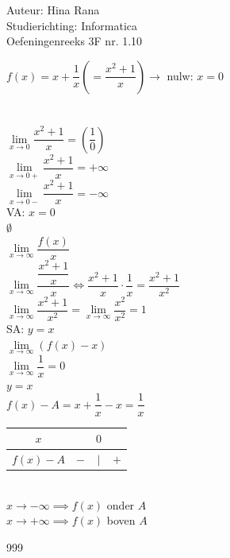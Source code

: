 \documentclass[a4paper]{article}
\begin{document}
\noindent \large Auteur: Hina Rana \\
\noindent \large Studierichting: Informatica\\
\noindent \large Oefeningenreeks 3F nr. 1.10\\

\medskip

\normalsize

$f(x) = x + \dfrac{1}{x} \left(= \dfrac{x^2+1}{x}\right) \to$ nulw: $x = 0$ \\
\\

 \\

$\lim\limits_{x \to 0} \dfrac{x^2+1}{x} = \left(\dfrac{1}{0}\right)$ \\

$\lim\limits_{x \to 0+} \dfrac{x^2+1}{x} = +\infty$ \\

$\lim\limits_{x \to 0-} \dfrac{x^2+1}{x} = -\infty$\\

VA: $x = 0$ \\

 $\emptyset$ \\

 $\lim\limits_{x \to \infty} \dfrac{f(x)}{x}$ \\

$\lim\limits_{x \to \infty} \dfrac{\dfrac{x^2+1}{x}}{x} \iff \dfrac{x^2+1}{x} \cdot \dfrac{1}{x} = \dfrac{x^2+1}{x^2}$ \\

$\lim\limits_{x \to \infty} \dfrac{x^2+1}{x^2} = \lim\limits_{x \to \infty} \dfrac{x^2}{x^2} = 1$ \\

SA: $y = x$\\

$\lim\limits_{x \to \infty} (f(x) - x)$ \\

$\lim\limits_{x \to \infty} \dfrac{1}{x} = 0$ \\

$y = x$ \\

$f(x) - A = x + \dfrac{1}{x} - x = \dfrac{1}{x}$ \\

\begin{tabular}{c|ccc}
$x$ & & $0$ & \\ \hline
$f(x) - A$ & $-$ & $\vert$ & $+$ 
\end{tabular} \\

$x \to -\infty \implies f(x)$ onder $A$ \\

$x \to +\infty \implies f(x)$ boven $A$

\begin{thebibliography}{999}
\end{thebibliography}
\end{document}
